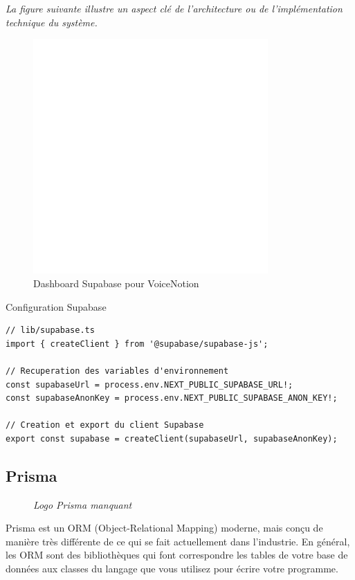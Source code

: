 \noindent
\textit{La figure suivante illustre un aspect clé de l'architecture ou de l'implémentation technique du système.}
\begin{figure}[H]
\centering
\includegraphics[width=0.8\textwidth]{assets/docs/supabase_dashboard.png}
\caption{Dashboard Supabase pour VoiceNotion}
\label{fig:supabase-dashboard}
\end{figure}

\begin{codebox}{Configuration Supabase}
\begin{lstlisting}
// lib/supabase.ts
import { createClient } from '@supabase/supabase-js';

// Recuperation des variables d'environnement
const supabaseUrl = process.env.NEXT_PUBLIC_SUPABASE_URL!;
const supabaseAnonKey = process.env.NEXT_PUBLIC_SUPABASE_ANON_KEY!;

// Creation et export du client Supabase
export const supabase = createClient(supabaseUrl, supabaseAnonKey);
\end{lstlisting}
\end{codebox}

\subsection{Prisma}
\begin{figure}
    \centering
    \textit{Logo Prisma manquant}
\end{figure}
Prisma est un ORM (Object-Relational Mapping) moderne, mais conçu de manière très différente de ce qui se fait actuellement dans l'industrie. En général, les ORM sont des bibliothèques qui font correspondre les tables de votre base de données aux classes du langage que vous utilisez pour écrire votre programme.

